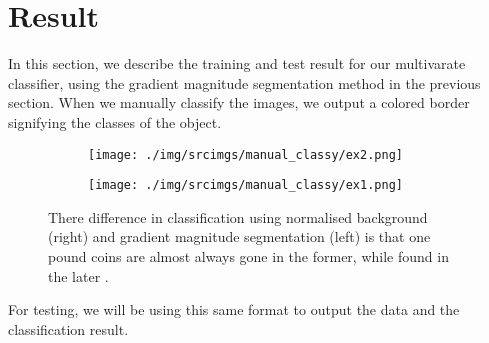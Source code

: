 \documentclass[main.tex]{subfiles}
\begin{document}
\section{Result} \label{result}
In this section, we describe the training and test result for our multivarate classifier, using the gradient magnitude segmentation method in the previous section. When we manually classify the images, we output a colored border signifying the classes of the object.

\begin{figure}[!h]
  \centering
  \begin{subfigure}[b]{.4\textwidth}
    \centering
    \texttt{[image: ./img/srcimgs/manual\_classy/ex2.png]}
  \end{subfigure}
  \begin{subfigure}[b]{.4\textwidth}
    \centering
    \texttt{[image: ./img/srcimgs/manual\_classy/ex1.png]}
  \end{subfigure}
  \caption{ There difference in classification using normalised background (right) and gradient magnitude segmentation (left) is that one pound coins are almost always gone in the former, while found in the later .}
  \label{bin_image}
\end{figure}

For testing, we will be using this same format to output the data and the classification result.
\end{document}

